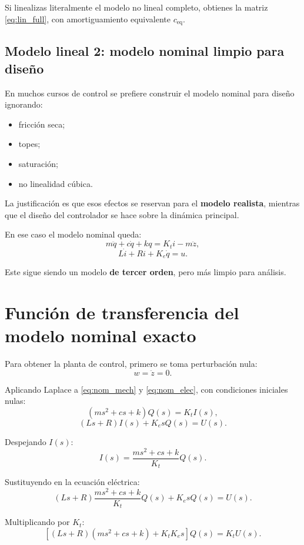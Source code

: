 \documentclass[11pt]{article}
\begin{document}
Si linealizas literalmente el modelo no lineal completo, obtienes la matriz \eqref{eq:lin_full}, con amortiguamiento equivalente $c_{\text{eq}}$.

\subsection{Modelo lineal 2: modelo nominal limpio para dise\~no}

En muchos cursos de control se prefiere construir el modelo nominal para dise\~no ignorando:

\begin{itemize}[leftmargin=1.2cm]
\item fricci\'on seca;
\item topes;
\item saturaci\'on;
\item no linealidad c\'ubica.
\end{itemize}

La justificaci\'on es que esos efectos se reservan para el \textbf{modelo realista}, mientras que el dise\~no del controlador se hace sobre la din\'amica principal.

En ese caso el modelo nominal queda:
\begin{equation}
m\ddot q + c\dot q + kq = K_t i - m\ddot z,
\label{eq:nom_mech}
\end{equation}
\begin{equation}
L\dot i + Ri + K_e\dot q = u.
\label{eq:nom_elec}
\end{equation}

Este sigue siendo un modelo \textbf{de tercer orden}, pero m\'as limpio para an\'alisis.

\section{Funci\'on de transferencia del modelo nominal exacto}

Para obtener la planta de control, primero se toma perturbaci\'on nula:
\[
w=\ddot z=0.
\]

Aplicando Laplace a \eqref{eq:nom_mech} y \eqref{eq:nom_elec}, con condiciones iniciales nulas:
\[
(ms^2+cs+k)Q(s)=K_t I(s),
\]
\[
(Ls+R)I(s)+K_e sQ(s)=U(s).
\]

Despejando $I(s)$:
\[
I(s)=\frac{ms^2+cs+k}{K_t}Q(s).
\]

Sustituyendo en la ecuaci\'on el\'ectrica:
\[
(Ls+R)\frac{ms^2+cs+k}{K_t}Q(s)+K_e sQ(s)=U(s).
\]

Multiplicando por $K_t$:
\[
\left[(Ls+R)(ms^2+cs+k)+K_tK_e s\right]Q(s)=K_tU(s).
\]
\end{document}
